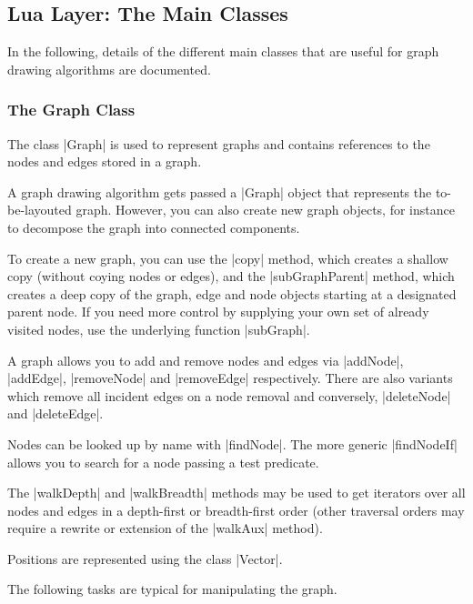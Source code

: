 \subsection{Lua Layer: The Main Classes}

In the following, details of the different main classes that are
useful for graph drawing algorithms are documented.


\subsubsection{The Graph Class}

The class |Graph| is used to represent graphs and contains
references to the nodes and edges stored in a graph.

A graph drawing algorithm gets passed a |Graph| object that represents
the to-be-layouted graph. However, you can also create new graph
objects, for instance to decompose the graph into connected
components. 

To create a new graph, you can use the |copy| method, which creates a 
shallow copy (without coying nodes or edges), and the
|subGraphParent| method, which creates a deep copy of the graph, edge
and node objects starting at a designated parent node. If you need
more control by supplying your own set of already visited nodes, use
the underlying function |subGraph|.

A graph allows you to add and remove nodes and edges via |addNode|,
|addEdge|, |removeNode| and |removeEdge| respectively.  There are also
variants which remove all incident edges on a node removal and
conversely, |deleteNode| and |deleteEdge|.

Nodes can be looked up by name with |findNode|. The more generic
|findNodeIf| allows you to search for a node passing a test
predicate. 

The |walkDepth| and |walkBreadth| methods may be used to get
iterators over all nodes and edges in a depth-first or breadth-first
order (other traversal orders may require a rewrite or extension of the
|walkAux| method).

Positions are represented using the class |Vector|.

The following tasks are typical for manipulating the graph.

